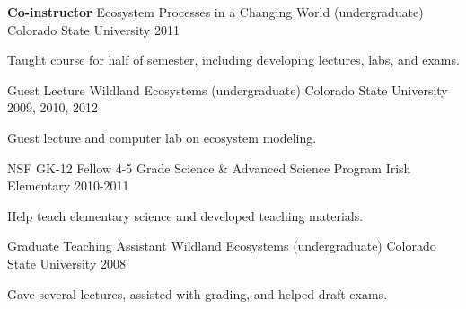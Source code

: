 \begin{cventries}
  \cventry
    {\textbf{Co-instructor}} %
    {Ecosystem Processes in a Changing World (undergraduate)} %
    {Colorado State University} %
    {2011} %
    {
      \begin{cvitems} %
        \item {Taught course for half of semester, including developing lectures, labs, and exams.}
      \end{cvitems}
    }

  \cventry
    {Guest Lecture} %
    {Wildland Ecosystems (undergraduate)} %
    {Colorado State University} %
    {2009, 2010, 2012} %
    {
      \begin{cvitems} %
        \item {Guest lecture and computer lab on ecosystem modeling.}
      \end{cvitems}
    }

  \cventry
    {NSF GK-12 Fellow} %
    {4-5 Grade Science \& Advanced Science Program} %
    {Irish Elementary} %
    {2010-2011} %
    {
      \begin{cvitems} %
        \item {Help teach elementary science and developed teaching materials.}
      \end{cvitems}
    }


  \cventry
    {Graduate Teaching Assistant} %
    {Wildland Ecosystems (undergraduate)} %
    {Colorado State University} %
    {2008} %
    {
      \begin{cvitems} %
        \item {Gave several lectures, assisted with grading, and helped draft exams.}
      \end{cvitems}
    }

\end{cventries}
